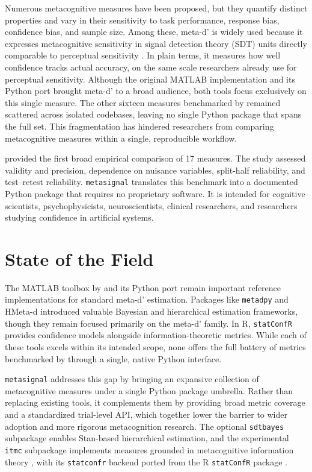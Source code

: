 \documentclass{article}
\begin{document}
Numerous metacognitive measures have been proposed, but they quantify distinct properties and vary in their sensitivity to task performance, response bias, confidence bias, and sample size. Among these, meta-d' is widely used because it expresses metacognitive sensitivity in signal detection theory (SDT) units directly comparable to perceptual sensitivity \citep{maniscalco2012}. In plain terms, it measures how well confidence tracks actual accuracy, on the same scale researchers already use for perceptual sensitivity. Although the original MATLAB implementation \citep{maniscalco2014} and its Python port \citep{lee_metad_python} brought meta-d' to a broad audience, both tools focus exclusively on this single measure. The other sixteen measures benchmarked by \citet{rahnev2025} remained scattered across isolated codebases, leaving no single Python package that spans the full set. This fragmentation has hindered researchers from comparing metacognitive measures within a single, reproducible workflow.

\citet{rahnev2025} provided the first broad empirical comparison of 17 measures. The study assessed validity and precision, dependence on nuisance variables, split-half reliability, and test--retest reliability. \texttt{metasignal} translates this benchmark into a documented Python package that requires no proprietary software. It is intended for cognitive scientists, psychophysicists, neuroscientists, clinical researchers, and researchers studying confidence in artificial systems.

\section{State of the Field}\label{state-of-the-field}

The MATLAB toolbox by \citet{maniscalco2014} and its Python port \citep{lee_metad_python} remain important reference implementations for standard meta-d' estimation. Packages like \texttt{metadpy} \citep{legrand2021} and HMeta-d \citep{fleming2017} introduced valuable Bayesian and hierarchical estimation frameworks, though they remain focused primarily on the meta-d' family. In R, \texttt{statConfR} \citep{rausch2025} provides confidence models alongside information-theoretic metrics. While each of these tools excels within its intended scope, none offers the full battery of metrics benchmarked by \citet{rahnev2025} through a single, native Python interface.

\texttt{metasignal} addresses this gap by bringing an expansive collection of metacognitive measures under a single Python package umbrella. Rather than replacing existing tools, it complements them by providing broad metric coverage and a standardized trial-level API, which together lower the barrier to wider adoption and more rigorous metacognition research. The optional \texttt{sdtbayes} subpackage enables Stan-based hierarchical estimation, and the experimental \texttt{itmc} subpackage implements measures grounded in metacognitive information theory \citep{dayan2023, meyen2025}, with its \texttt{statconfr} backend ported from the R \texttt{statConfR} package \citep{rausch2025}.
\end{document}

